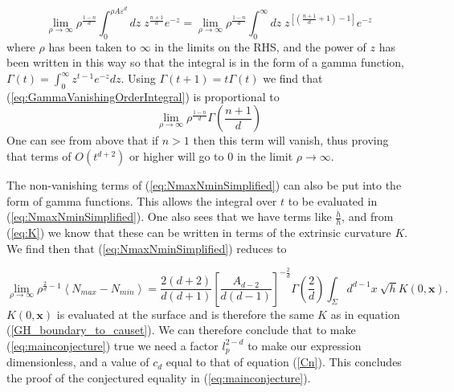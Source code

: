 \documentclass[12pt]{article}
\newcommand{\be}{\begin{equation}}
\newcommand{\ee}{\end{equation}}
\begin{document}
\be\label{eq:GammaVanishingOrderIntegral}
\lim_{\rho \to \infty}\rho^{\frac{1-n}{d}}\int_{0}^{\rho A\varepsilon^d}dz\;z^{\frac{n+1}{d}}e^{-z}=\lim_{\rho \to \infty}\rho^{\frac{1-n}{d}}\int_{0}^{\infty}dz\;z^{\left[\left(\frac{n+1}{d}+1\right)-1 \right]}e^{-z}
\ee
where $\rho$ has been taken to $\infty$ in the limits on the RHS, and the power of $z$ has been written in this way so that the integral is in the form of a gamma function, $\Gamma(t)=\int_{0}^{\infty}z^{t-1}e^{-z}dz$. Using $\Gamma(t+1)=t\Gamma(t)$ we find that (\ref{eq:GammaVanishingOrderIntegral}) is proportional to
\be\label{eq:GammaVanishingOrder}
\lim_{\rho \to \infty}\rho^{\frac{1-n}{d}}\Gamma\left(\frac{n+1}{d}\right)
\ee
One can see from above that if $n>1$ then this term will vanish, thus proving that terms of $O(t^{d+2})$ or higher will go to $0$ in the limit $\rho\rightarrow\infty$.

The non-vanishing terms of (\ref{eq:NmaxNminSimplified}) can also be put into the form of gamma functions. This allows the integral over $t$ to be evaluated in (\ref{eq:NmaxNminSimplified}). One also sees that we have terms like $\frac{\dot{h}}{h}$, and from (\ref{eq:K}) we know that these can be written in terms of the extrinsic curvature $K$. We find then that (\ref{eq:NmaxNminSimplified}) reduces to

\be\label{eq:nmax_eq:nmin_end}
\lim_{\rho \to \infty}\rho^{\frac{2}{d}-1}\left\langle N_{max}-N_{min} \right\rangle=
\frac{2(d+2)}{d(d+1)}
\left[\frac{A_{d-2}}{d(d-1)}\right]^{-\frac{2}{d}}
\Gamma\left(\frac{2}{d}\right)\int_{\Sigma}d^{d-1}x\
\sqrt{h}K(0,\mathbf{x}).
\ee
$K(0,\mathbf{x})$ is evaluated at the surface and is therefore the same $K$ as in equation (\ref{GH_boundary_to_causet}). We can therefore conclude that to make (\ref{eq:mainconjecture}) true we need a factor $l_{p}^{2-d}$ to make our expression dimensionless, and a value of $c_d$ equal to that of equation (\ref{Cn}). This concludes the proof of the conjectured equality in (\ref{eq:mainconjecture}).
\end{document}
